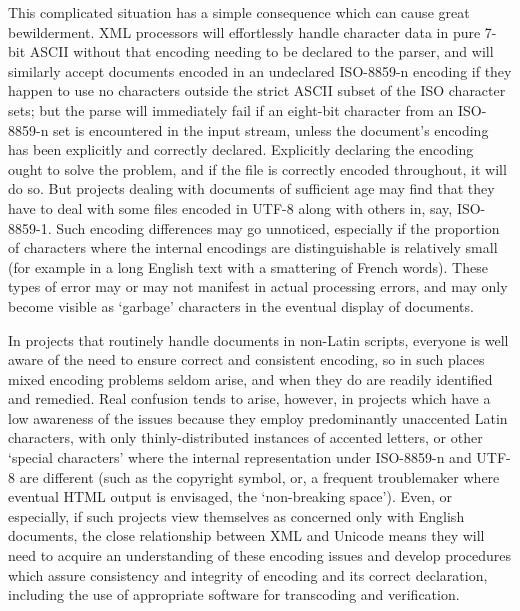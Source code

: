This complicated situation has a simple consequence which can cause great bewilderment. XML processors will effortlessly handle character data in pure 7-bit ASCII without that encoding needing to be declared to the parser, and will similarly accept documents encoded in an undeclared ISO-8859-n encoding if they happen to use no characters outside the strict ASCII subset of the ISO character sets; but the parse will immediately fail if an eight-bit character from an ISO-8859-n set is encountered in the input stream, unless the document's encoding has been explicitly and correctly declared. Explicitly declaring the encoding ought to solve the problem, and if the file is correctly encoded throughout, it will do so. But projects dealing with documents of sufficient age may find that they have to deal with some files encoded in UTF-8 along with others in, say, ISO-8859-1. Such encoding differences may go unnoticed, especially if the proportion of characters where the internal encodings are distinguishable is relatively small (for example in a long English text with a smattering of French words). These types of error may or may not manifest in actual processing errors, and may only become visible as ‘garbage’ characters in the eventual display of documents.\par
In projects that routinely handle documents in non-Latin scripts, everyone is well aware of the need to ensure correct and consistent encoding, so in such places mixed encoding problems seldom arise, and when they do are readily identified and remedied. Real confusion tends to arise, however, in projects which have a low awareness of the issues because they employ predominantly unaccented Latin characters, with only thinly-distributed instances of accented letters, or other ‘special characters’ where the internal representation under ISO-8859-n and UTF-8 are different (such as the copyright symbol, or, a frequent troublemaker where eventual HTML output is envisaged, the ‘non-breaking space’). Even, or especially, if such projects view themselves as concerned only with English documents, the close relationship between XML and Unicode means they will need to acquire an understanding of these encoding issues and develop procedures which assure consistency and integrity of encoding and its correct declaration, including the use of appropriate software for transcoding and verification.